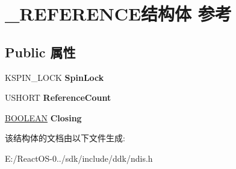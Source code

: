 \hypertarget{struct___r_e_f_e_r_e_n_c_e}{}\section{\+\_\+\+R\+E\+F\+E\+R\+E\+N\+C\+E结构体 参考}
\label{struct___r_e_f_e_r_e_n_c_e}
\subsection*{Public 属性}
\begin{DoxyCompactItemize}
\item 
\mbox{\label{struct___r_e_f_e_r_e_n_c_e_a477fd1d0dcb692528b3daac9521cf669}} 
K\+S\+P\+I\+N\+\_\+\+L\+O\+CK {\bfseries Spin\+Lock}
\item 
\mbox{\label{struct___r_e_f_e_r_e_n_c_e_a36901b3debf98cf4254952dace9e6473}} 
U\+S\+H\+O\+RT {\bfseries Reference\+Count}
\item 
\mbox{\label{struct___r_e_f_e_r_e_n_c_e_a7b4abff8554df0fc1840d96ddeb4fb8d}} 
\hyperlink{_processor_bind_8h_a112e3146cb38b6ee95e64d85842e380a}{B\+O\+O\+L\+E\+AN} {\bfseries Closing}
\end{DoxyCompactItemize}


该结构体的文档由以下文件生成\+:\begin{DoxyCompactItemize}
\item 
E\+:/\+React\+O\+S-\/0../sdk/include/ddk/ndis.\+h\end{DoxyCompactItemize}
